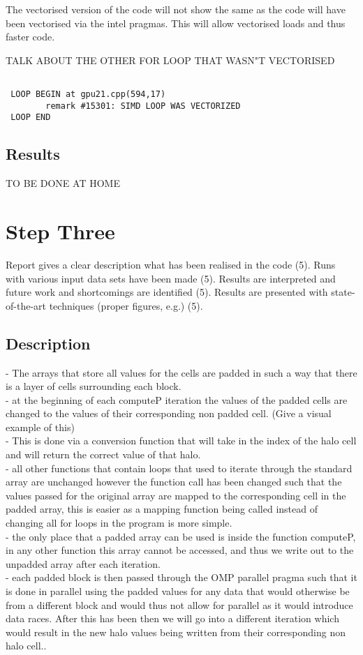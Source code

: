 \documentclass[paper=a4, fontsize=11pt]{scrartcl}
\numberwithin{equation}{section}		%
\numberwithin{figure}{section}			%
\numberwithin{table}{section}				%
\begin{document}
The vectorised version of the code will not show the same as the code will have been vectorised via the intel pragmas. This will allow vectorised loads and thus faster code.

TALK ABOUT THE OTHER FOR LOOP THAT WASN"T VECTORISED

\begin{lstlisting}

 LOOP BEGIN at gpu21.cpp(594,17)
		remark #15301: SIMD LOOP WAS VECTORIZED
 LOOP END

\end{lstlisting}

\subsection{Results}

TO BE DONE AT HOME


\section{Step Three}
Report gives a clear description what has been realised in the code (5). Runs with various input data sets have been made (5). Results are interpreted and future work and shortcomings are identified (5). Results are presented with state-of-the-art techniques (proper figures, e.g.) (5).
\subsection{Description}

- The arrays that store all values for the cells are padded in such a way that there is a layer of cells surrounding each block.\\
- at the beginning of each computeP iteration the values of the padded cells are changed to the values of their corresponding non padded cell. (Give a visual example of this)\\
- This is done via a conversion function that will take in the index of the halo cell and will return the correct value of that halo.\\
- all other functions that contain loops that used to iterate through the standard array are unchanged however the function call has been changed such that the values passed for the original array are mapped to the corresponding cell in the padded array, this is easier as a mapping function being called instead of changing all for loops in the program is more simple.\\
- the only place that a padded array can be used is inside the function computeP, in any other function this array cannot be accessed, and thus we write out to the unpadded array after each iteration.\\
- each padded block is then passed through the OMP parallel pragma such that it is done in parallel using the padded values for any data that would otherwise be from a different block and would thus not allow for parallel as it would introduce data races. After this has been then we will go into a different iteration which would result in the new halo values being written from their corresponding non halo cell.. 
\end{document}
